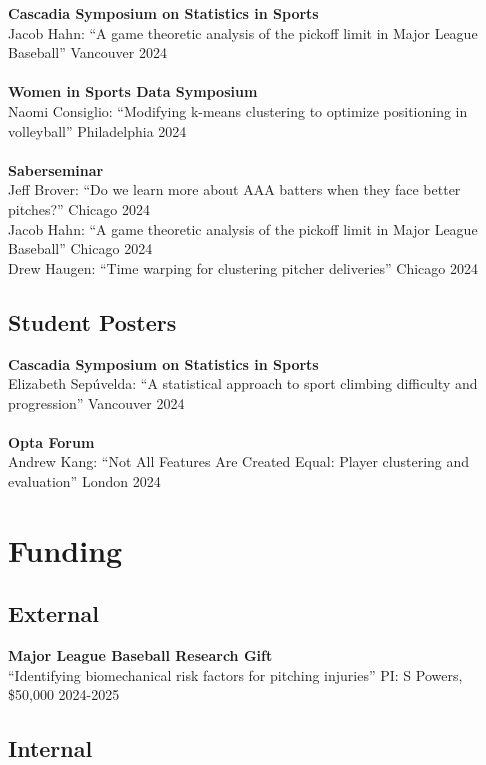 \documentclass{article}
\begin{document}
{\bf Cascadia Symposium on Statistics in Sports}\\
Jacob Hahn: ``A game theoretic analysis of the pickoff limit in Major League Baseball'' \hfill Vancouver 2024\\
~\\
{\bf Women in Sports Data Symposium}\\
Naomi Consiglio: ``Modifying k-means clustering to optimize positioning in volleyball'' \hfill Philadelphia 2024\\
~\\
{\bf Saberseminar}\\
Jeff Brover: ``Do we learn more about AAA batters when they face better pitches?'' \hfill Chicago 2024\\
Jacob Hahn: ``A game theoretic analysis of the pickoff limit in Major League Baseball'' \hfill Chicago 2024\\
Drew Haugen: ``Time warping for clustering pitcher deliveries'' \hfill Chicago 2024

\subsection*{\sc Student Posters}

{\bf Cascadia Symposium on Statistics in Sports}\\
Elizabeth Sep\'uvelda: ``A statistical approach to sport climbing difficulty and progression'' \hfill Vancouver 2024\\
~\\
{\bf Opta Forum}\\
Andrew Kang: ``Not All Features Are Created Equal: Player clustering and evaluation''  \hfill London 2024


\section*{\sc Funding}

\subsection*{\sc External}

{\bf Major League Baseball Research Gift}\\
``Identifying biomechanical risk factors for pitching injuries'' PI: S Powers, \$50,000 \hfill 2024-2025

\subsection*{\sc Internal}
\end{document}
